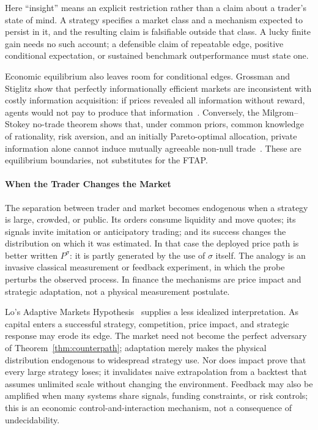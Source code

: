\documentclass[aps,pra,reprint,superscriptaddress,amsmath,amssymb,floatfix]{revtex4-2}
\theoremstyle{plain}
\theoremstyle{definition}
\theoremstyle{remark}
\begin{document}
Here ``insight'' means an explicit restriction rather than a claim about a
trader's state of mind. A strategy specifies a market class and a mechanism
expected to persist in it, and the resulting claim is falsifiable outside that
class. A lucky finite gain needs no such account; a defensible claim of
repeatable edge, positive conditional expectation, or sustained benchmark
outperformance must state one.

Economic equilibrium also leaves room for conditional edges. Grossman and
Stiglitz show that perfectly informationally efficient markets are
inconsistent with costly information acquisition: if prices revealed all
information without reward, agents would not pay to produce that
information~\cite{GrossmanStiglitz1980}. Conversely, the Milgrom--Stokey
no-trade theorem shows that, under common priors, common knowledge of
rationality, risk aversion, and an initially Pareto-optimal allocation, private
information alone cannot induce mutually agreeable non-null
trade~\cite{MilgromStokey1982}. These are equilibrium boundaries, not
substitutes for the FTAP.

\paragraph{When the Trader Changes the Market}

The separation between trader and market becomes endogenous when a strategy is
large, crowded, or public. Its orders consume liquidity and move quotes; its
signals invite imitation or anticipatory trading; and its success changes the
distribution on which it was estimated. In that case the deployed price path
is better written \(P^\sigma\): it is partly generated by the use of
\(\sigma\) itself. The analogy is an invasive classical measurement or
feedback experiment, in which the probe perturbs the observed process. In
finance the mechanisms are price impact and strategic adaptation, not a
physical measurement postulate.

Lo's Adaptive Markets Hypothesis~\cite{Lo2004} supplies a less idealized
interpretation. As capital enters a successful strategy, competition, price
impact, and strategic response may erode its edge. The market need not become
the perfect adversary of Theorem~\ref{thm:counterpath}; adaptation merely makes
the physical distribution endogenous to widespread strategy use. Nor does
impact prove that every large strategy loses; it invalidates naive
extrapolation from a backtest that assumes unlimited scale without changing
the environment. Feedback may also be amplified when many systems share
signals, funding constraints, or risk controls; this is an economic
control-and-interaction mechanism, not a consequence of undecidability.
\end{document}
